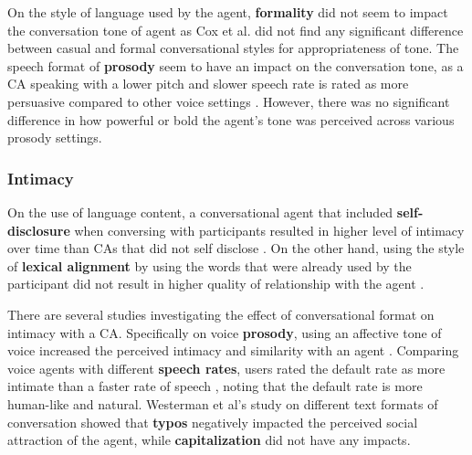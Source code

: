 \documentclass[sigconf,screen,review, anonymous]{acmart}
\newcommand{\cmt}[1]{}%
\begin{document}
On the style of language used by the agent, \textbf{formality} did not seem to impact the conversation tone of agent as Cox et al. \cite{cox2022does}\cmt{[27]} did not find any significant difference between casual and formal conversational styles for appropriateness of tone. The speech format of \textbf{prosody} seem to have an impact on the conversation tone, as a CA speaking with a lower pitch and slower speech rate is rated as more persuasive compared to other voice settings \cite{dubiel2020persuasive}\cmt{[60]}. However, there was no significant difference in how powerful or bold the agent's tone was perceived across various prosody settings.



%


\subsubsection{Intimacy}
On the use of language content, a conversational agent that included \textbf{self-disclosure} when conversing with participants resulted in higher level of intimacy over time than CAs that did not self disclose \cite{lee2020hear}\cmt{[23]}. On the other hand, using the style of \textbf{lexical alignment} by using the words that were already used by the participant did not result in higher quality of relationship with the agent \cite{linnemann2018can}\cmt{[15]}.



%


There are several studies investigating the effect of conversational format on intimacy with a CA. Specifically on voice \textbf{prosody}, using an affective tone of voice increased the perceived intimacy and similarity with an agent \cite{kim2020can}\cmt{[24]}. Comparing voice agents with different \textbf{speech rates}, users rated the default rate as more intimate than a faster rate of speech \cite{choi2020nobody}\cmt{[54]}, noting that the default rate is more human-like and natural. Westerman et al's study on different text formats of conversation \cite{westerman2019believe}\cmt{[9]} showed that \textbf{typos} negatively impacted the perceived social attraction of the agent, while \textbf{capitalization} did not have any impacts.
\end{document}
